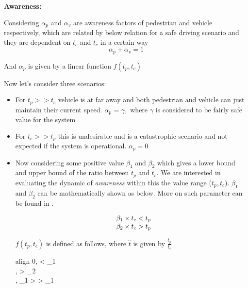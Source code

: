 \newpara
\textbf{Awareness:}

Considering $\alpha_p$ and $\alpha_v$ are awareness factors of pedestrian and vehicle respectively, which are related by below relation for a safe driving scenario and they are dependent on ${t_c}$ and ${t_c}$ in a certain way \\
\begin{equation} \label{awareness_factor}
  \alpha_p + \alpha_v = 1
\end{equation}

And $\alpha_p$ is given by a linear function \cite{} $f(t_p, t_c)$ 

Now let's consider three scenarios:

\begin{itemize}
\item 
For ${t_p}>>{t_c}$ vehicle is at far away and both pedestrian and vehicle can just maintain their current speed. $\alpha_p$ = $\gamma,$ where $\gamma$ is considered to be fairly safe value for the system

\item 
For ${t_c}>>{t_p}$ this is undesirable and is a catastrophic scenario and not expected if the system is operational. $\alpha_p = 0$

\item
	Now considering some positive value $\beta_1$ and $\beta_2$ which gives a lower bound and upper bound of the ratio between $t_p$ and $t_c$. We are interested in evaluating the dynamic of \textit{awareness} within this the value range ($t_p, t_c$). $\beta_1$ and $\beta_2$ can be mathematically shown as below. More on such parameter can be found in \cite{yousef2016forward}.

	\begin{equation}
	\begin{array}{l@{}}
		\beta_1 \times {t_c} < {t_p} \\
		\beta_2 \times {t_c} > {t_p}
	\end{array}
	\end{equation}

	$f(t_p, t_c)$ is defined as follows, where $\hat{t}$ is given by $\frac{t_p}{t_c}$\\
	\begin{empheq}[left=\empheqlbrace]{align}
		0,  < \beta_1 \\
		\gamma,  > \beta_2 \\
		\gamma \times {}, \beta_1 >  > \beta_1
	\end{empheq}

\end {itemize}


